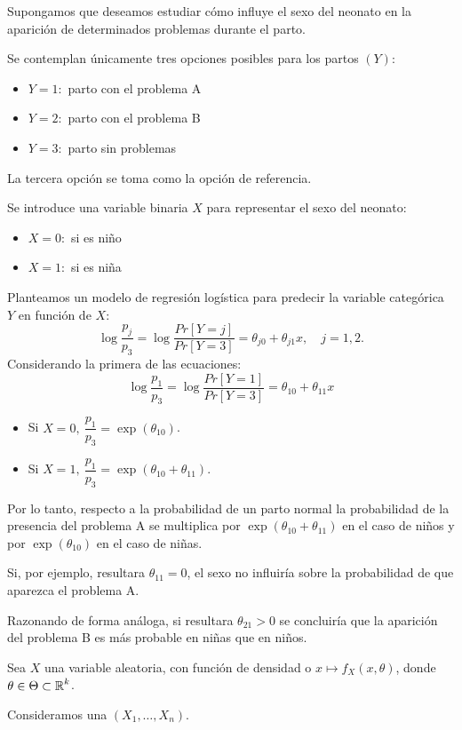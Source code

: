 Supongamos que deseamos estudiar cómo influye el sexo del neonato en la aparición de determinados problemas durante el parto.

Se contemplan únicamente tres opciones posibles para los partos $(Y)$:
\begin{itemize}
	\item $Y=1:$ parto con el problema A
	\item $Y=2:$ parto con el problema B
	\item $Y=3:$ parto sin problemas
\end{itemize}
La tercera opción se toma como la opción de referencia.

Se introduce una variable binaria $X$ para representar el sexo del neonato:
\begin{itemize}
	\item $X=0:$ si es niño
	\item $X=1:$ si es niña
\end{itemize}
Planteamos un modelo de regresión logística para predecir la variable categórica $Y$ en función de $X$:\[ \log\dfrac{p_j}{p_3}=\log\dfrac{Pr[Y=j]}{Pr[Y=3]}=\theta_{j0}+\theta_{j1}x,\quad j=1,2. \]
Considerando la primera de las ecuaciones: \[ \log\dfrac{p_1}{p_3}=\log\dfrac{Pr[Y=1]}{Pr[Y=3]}=\theta_{10}+\theta_{11}x \]
\begin{itemize}
	\item Si $X=0,\:\dfrac{p_1}{p_3}=\exp(\theta_{10})$.
	\item Si $X=1,\:\dfrac{p_1}{p_3}=\exp(\theta_{10}+\theta_{11})$.
\end{itemize}
Por lo tanto, respecto a la probabilidad de un parto normal la probabilidad de la presencia del problema A se multiplica por $\exp(\theta_{10}+\theta_{11})$ en el caso de niños y por $\exp(\theta_{10})$ en el caso de niñas.

Si, por ejemplo, resultara $\theta_{11}=0$, el sexo no influiría sobre la probabilidad de que aparezca el problema A.

Razonando de forma análoga, si resultara $\theta_{21}>0$ se concluiría que la aparición del problema B es más probable en niñas que en niños.

Sea $X$ una variable aleatoria, con función de densidad o \fpp $x\longmapsto f_X(x,\theta)$, donde $\theta\in\Theta\subset\operatorname{\mathbb{R}}^k$.

Consideramos una \mas $(X_1,\dots,X_n)$.

